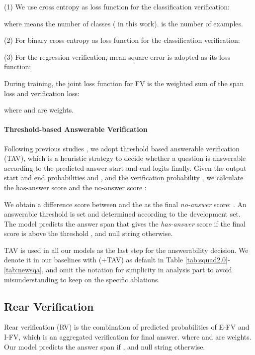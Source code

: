 \documentclass[letterpaper]{article} \usepackage{aaai21}  \usepackage{times}  \usepackage{helvet} \usepackage{courier}  \usepackage[hyphens]{url}  \usepackage{graphicx}
\begin{document}
(1) We use cross entropy as loss function for the classification verification: 

where  means the number of classes ( in this work).  is the number of examples.

(2) For binary cross entropy as loss function for the classification verification: 


(3) For the regression verification, mean square error is adopted as its loss function: 



During training, the joint loss function for FV is the weighted sum of the span loss and verification loss:

where  and  are weights.


\paragraph{Threshold-based Answerable Verification}\label{sec:ap}
Following previous studies \cite{devlin2018bert,yang2019xlnet,liu2019roberta,Lan2020ALBERT}, we adopt threshold based answerable verification (TAV), which is a heuristic strategy to decide whether a question is answerable according to the predicted answer start and end logits finally. Given the output start and end probabilities  and , and the verification probability , we calculate the has-answer score  and the no-answer score :


We obtain a difference score between  and the  as the final \textit{no-answer} score: . An answerable threshold  is set and determined according to the development set. The model predicts the answer span that gives the \textit{has-answer} score if the final score is above the threshold , and null string otherwise.

TAV is used in all our models as the last step for the answerability  decision. We denote it in our baselines with (+TAV) as default in Table \ref{tab:squad2.0}-\ref{tab:newsqa}, and omit the notation for simplicity in analysis part to avoid misunderstanding to keep on the specific ablations.

\subsection{Rear Verification}
Rear verification (RV) is the combination of predicted probabilities of E-FV and I-FV, which is an aggregated verification for final answer. 
where  and  are weights. Our model predicts the answer span if , and null string otherwise.
\end{document}
